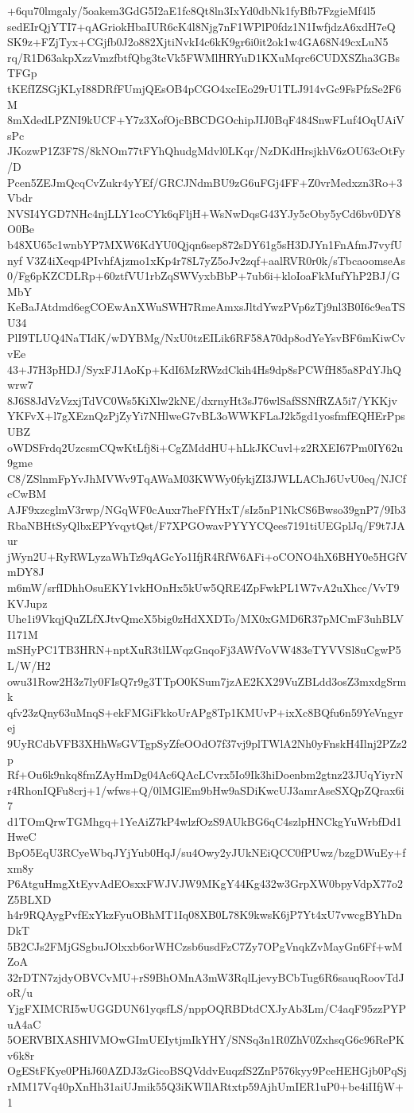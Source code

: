 +6qu70lmgaly/5oakem3GdG5I2aE1fc8Qt8ln3IxYd0dbNk1fyBfb7FzgieMf4l5
sedEIrQjYTI7+qAGriokHbaIUR6cK4l8Njg7nF1WPlP0fdz1N1IwfjdzA6xdH7eQ
SK9z+FZjTyx+CGjfb0J2o882XjtiNvkI4c6kK9gr6i0it2ok1w4GA68N49cxLuN5
rq/R1D63akpXzzVmzfbtfQbg3tcVk5FWMlHRYuD1KXuMqrc6CUDXSZha3GBsTFGp
tKEfIZSGjKLyI88DRfFUmjQEsOB4pCGO4xcIEo29rU1TLJ914vGc9FsPfzSe2F6M
8mXdedLPZNI9kUCF+Y7z3XofOjcBBCDGOchipJIJ0BqF484SnwFLuf4OqUAiVsPc
JKozwP1Z3F7S/8kNOm77tFYhQhudgMdvl0LKqr/NzDKdHrsjkhV6zOU63cOtFy/D
Pcen5ZEJmQcqCvZukr4yYEf/GRCJNdmBU9zG6uFGj4FF+Z0vrMedxzn3Ro+3Vbdr
NVSI4YGD7NHc4njLLY1coCYk6qFljH+WsNwDqsG43YJy5cOby5yCd6bv0DY8O0Be
b48XU65c1wnbYP7MXW6KdYU0Qjqn6sep872sDY61g5sH3DJYn1FnAfmJ7vyfUnyf
V3Z4iXeqp4PIvhfAjzmo1xKp4r78L7yZ5oJv2zqf+aalRVR0r0k/sTbcaoomseAs
0/Fg6pKZCDLRp+60ztfVU1rbZqSWVyxbBbP+7ub6i+kloIoaFkMufYhP2BJ/GMbY
KeBaJAtdmd6egCOEwAnXWuSWH7RmeAmxsJltdYwzPVp6zTj9nl3B0I6c9eaTSU34
PlI9TLUQ4NaTIdK/wDYBMg/NxU0tzEILik6RF58A70dp8odYeYsvBF6mKiwCvvEe
43+J7H3pHDJ/SyxFJ1AoKp+KdI6MzRWzdCkih4Hs9dp8sPCWfH85a8PdYJhQwrw7
8J6S8JdVzVzxjTdVC0Ws5KiXlw2kNE/dxrnyHt3sJ76wlSafSSNfRZA5i7/YKKjv
YKFvX+l7gXEznQzPjZyYi7NHlweG7vBL3oWWKFLaJ2k5gd1yosfmfEQHErPpsUBZ
oWDSFrdq2UzcsmCQwKtLfj8i+CgZMddHU+hLkJKCuvl+z2RXEI67Pm0IY62u9gme
C8/ZSlnmFpYvJhMVWv9TqAWaM03KWWy0fykjZI3JWLLAChJ6UvU0eq/NJCfcCwBM
AJF9xzcglmV3rwp/NGqWF0cAuxr7heFfYHxT/sIz5nP1NkCS6Bwso39gnP7/9Ib3
RbaNBHtSyQlbxEPYvqytQst/F7XPGOwavPYYYCQees7191tiUEGplJq/F9t7JAur
jWyn2U+RyRWLyzaWhTz9qAGcYo1IfjR4RfW6AFi+oCONO4hX6BHY0e5HGfVmDY8J
m6mW/srfIDhhOsuEKY1vkHOnHx5kUw5QRE4ZpFwkPL1W7vA2uXhcc/VvT9KVJupz
Uhe1i9VkqjQuZLfXJtvQmcX5big0zHdXXDTo/MX0xGMD6R37pMCmF3uhBLVI171M
mSHyPC1TB3HRN+nptXuR3tlLWqzGnqoFj3AWfVoVW483eTYVVSl8uCgwP5L/W/H2
owu31Row2H3z7ly0FIsQ7r9g3TTpO0KSum7jzAE2KX29VuZBLdd3osZ3mxdgSrmk
qfv23zQny63uMnqS+ekFMGiFkkoUrAPg8Tp1KMUvP+ixXc8BQfu6n59YeVngyrej
9UyRCdbVFB3XHhWsGVTgpSyZfeOOdO7f37vj9plTWlA2Nh0yFnskH4Ilnj2PZz2p
Rf+Ou6k9nkq8fmZAyHmDg04Ac6QAcLCvrx5Io9Ik3hiDoenbm2gtnz23JUqYiyrN
r4RhonIQFu8crj+1/wfws+Q/0lMGlEm9bHw9aSDiKwcUJ3amrAseSXQpZQrax6i7
d1TOmQrwTGMhgq+1YeAiZ7kP4wlzfOzS9AUkBG6qC4szlpHNCkgYuWrbfDd1HweC
BpO5EqU3RCyeWbqJYjYub0HqJ/su4Owy2yJUkNEiQCC0fPUwz/bzgDWuEy+fxm8y
P6AtguHmgXtEyvAdEOsxxFWJVJW9MKgY44Kg432w3GrpXW0bpyVdpX77o2Z5BLXD
h4r9RQAygPvfExYkzFyuOBhMT1Iq08XB0L78K9kwsK6jP7Yt4xU7vwcgBYhDnDkT
5B2CJs2FMjGSgbuJOlxxb6orWHCzsb6usdFzC7Zy7OPgVnqkZvMayGn6Ff+wMZoA
32rDTN7zjdyOBVCvMU+rS9BhOMnA3mW3RqlLjevyBCbTug6R6sauqRoovTdJoR/u
YjgFXIMCRI5wUGGDUN61yqsfLS/nppOQRBDtdCXJyAb3Lm/C4aqF95zzPYPuA4aC
5OERVBIXASHIVMOwGImUEIytjmIkYHY/SNSq3n1R0ZhV0ZxhsqG6c96RePKv6k8r
OgEStFKye0PHiJ60AZDJ3zGicoBSQVddvEuqzfS2ZnP576kyy9PceHEHGjb0PqSj
rMM17Vq40pXnHh31aiUJmik55Q3iKWIlARtxtp59AjhUmIER1uP0+be4iIIfjW+1
